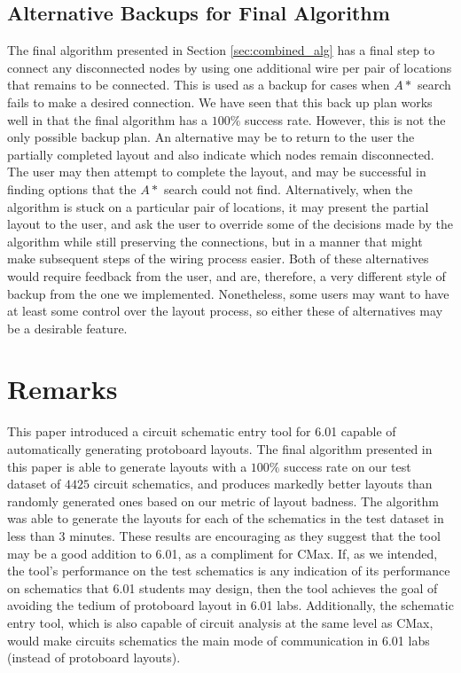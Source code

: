 \subsection{Alternative Backups for Final Algorithm}
The final algorithm presented in Section \ref{sec:combined_alg} has a final step
to connect any disconnected nodes by using one additional wire per pair of
locations that remains to be connected. This is used as a backup for cases
when $A*$ search fails to make a desired connection. We have seen that this
back up plan works well in that the final algorithm has a $100\%$ success rate.
However, this is not the only possible backup plan. An alternative may be to
return to the user the partially completed layout and also indicate which nodes
remain disconnected. The user may then attempt to complete the layout, and may
be successful in finding options that the $A*$ search could not find.
Alternatively, when the algorithm is stuck on a particular pair of locations, it
may present the partial layout to the user, and ask the user to override some of
the decisions made by the algorithm while still preserving the connections, but
in a manner that might make subsequent steps of the wiring process easier. Both
of these alternatives would require feedback from the user, and are, therefore,
a very different style of backup from the one we implemented. Nonetheless, some
users may want to have at least some control over the layout process,
so either these of alternatives may be a desirable feature.

\section{Remarks}

This paper introduced a circuit schematic entry tool for 6.01 capable of
automatically generating protoboard layouts. The final algorithm presented in
this paper is able to generate layouts with a $100\%$ success rate on our test
dataset of $4425$ circuit schematics, and produces markedly better layouts than
randomly generated ones based
on our metric of layout badness. The algorithm was able to generate the layouts
for each of the schematics in the test dataset in less than $3$ minutes.
These results are encouraging as they suggest
that the tool may be a good addition to 6.01, as a compliment for CMax. If, as
we intended, the tool's performance on the test schematics is any indication of
its performance on schematics that 6.01 students may design, then the tool
achieves the goal of avoiding the tedium of protoboard layout in 6.01 labs.
Additionally, the schematic entry tool, which is also capable of circuit
analysis at the same level as CMax, would make circuits schematics the main
mode of communication in 6.01 labs (instead of protoboard layouts).
